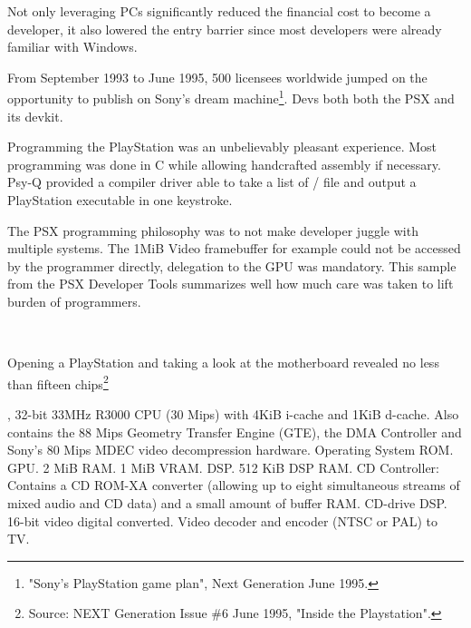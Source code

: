 \vspace{-10pt}
\par
Not only leveraging PCs significantly reduced the financial cost to become a developer, it also lowered the entry barrier since most developers were already familiar with Windows.\\
\par
From September 1993 to June 1995, 500 licensees worldwide jumped on the opportunity to publish on Sony's dream machine\footnote{"Sony's PlayStation game plan", Next Generation June 1995.}. Devs both both the PSX and its devkit.

Programming the PlayStation was an unbelievably pleasant experience. Most programming was done in C while allowing handcrafted assembly if necessary. Psy-Q provided a compiler driver able to take a list of / file and output a PlayStation executable in one keystroke.\\
\par
The PSX programming philosophy was to not make developer juggle with multiple systems. The 1MiB Video framebuffer for example could not be accessed by the programmer directly, delegation to the GPU was mandatory. This sample from the PSX Developer Tools summarizes well how much care was taken to lift burden of programmers.\\
\par
{}\\
\par
{}
\par









\par
Opening a PlayStation and taking a look at the motherboard revealed no less than fifteen chips\footnote{Source: NEXT Generation Issue \#6 June 1995, "Inside the Playstation".}\\
\par
{}, 32-bit 33MHz R3000 CPU (30 Mips) with  4KiB i-cache and 1KiB d-cache. Also contains the 88 Mips Geometry Transfer Engine (GTE), the DMA Controller and Sony's 80 Mips MDEC video decompression hardware.
 Operating System ROM.
 GPU.
 2 MiB RAM.
 1 MiB VRAM.
 DSP.
 512 KiB DSP RAM.
 CD Controller: Contains a CD ROM-XA converter (allowing up to eight simultaneous streams of mixed audio and CD data) and a small amount of buffer RAM.
 CD-drive DSP.
 16-bit video digital converted.
 Video decoder and encoder (NTSC or PAL) to TV.


